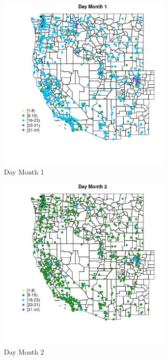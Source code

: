 \begin{figure} 
\centering  
\includegraphics[width=0.77\textwidth]{Code_Outputs/Report_ML_input_PM25_Step4_part_e_de_duplicated_aveswNAs_MapObsMo1Day.jpg} 
\caption{\label{fig:Report_ML_input_PM25_Step4_part_e_de_duplicated_aveswNAsMapObsMo1Day}Day Month 1} 
\end{figure} 
 

\begin{figure} 
\centering  
\includegraphics[width=0.77\textwidth]{Code_Outputs/Report_ML_input_PM25_Step4_part_e_de_duplicated_aveswNAs_MapObsMo2Day.jpg} 
\caption{\label{fig:Report_ML_input_PM25_Step4_part_e_de_duplicated_aveswNAsMapObsMo2Day}Day Month 2} 
\end{figure} 
 

